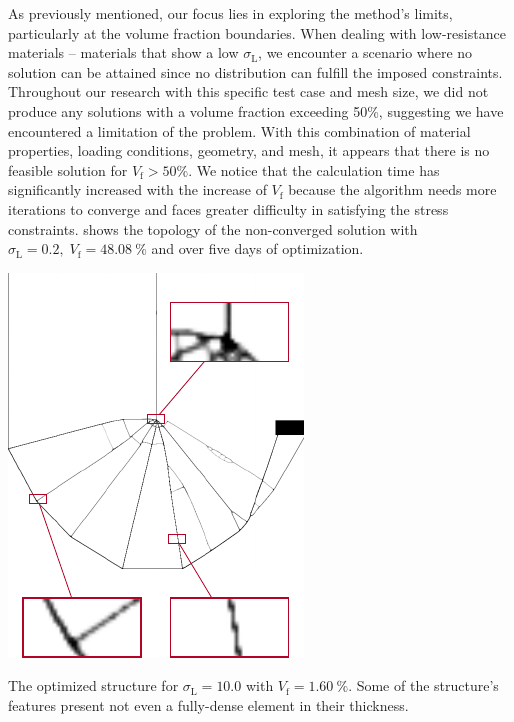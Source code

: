 As previously mentioned, our focus lies in exploring the method's limits, particularly at the volume fraction boundaries. When dealing with low-resistance materials -- \ie materials that show a low $\sigma_\text{L}$, we encounter a scenario where no solution can be attained since no distribution can fulfill the imposed constraints. Throughout our research with this specific test case and mesh size, we did not produce any solutions with a volume fraction exceeding 50\%, suggesting we have encountered a limitation of the problem. With this combination of material properties, loading conditions, geometry, and mesh, it appears that there is no feasible solution for $V_\text{f} > 50\%$. We notice that the calculation time has significantly increased with the increase of $V_\text{f}$ because the algorithm needs more iterations to converge and faces greater difficulty in satisfying the stress constraints.  shows the topology of the non-converged solution with $\sigma_\text{L}=0.2, \; V_\text{f}=\qty{48.08}{\percent}$ and over five days of optimization.
\begin{marginfigure}
    \centering
    \includegraphics[width=0.8\linewidth]{figures/03_comparison_TO_TTO/09_to_zoom/to_zoom.pdf}
    \caption{The optimized structure for $\sigma_\text{L}=10.0$ with $V_\text{f}=\qty{1.60}{\percent}$. Some of the structure's features present not even a fully-dense element in their thickness.}
    \label{fig:03_to_sol_zoom}
\end{marginfigure}

